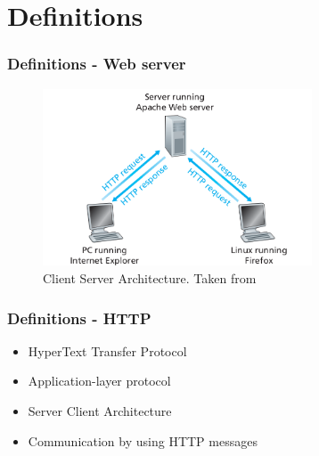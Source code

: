 \documentclass[9pt]{beamer}
\begin{document}
\section{Definitions}
\begin{frame}
  \frametitle<presentation>{Definitions - Web server}

  \begin{figure}[h]
    \centerline{\includegraphics[width=8cm]{pics/client_server.png}}
    \caption{Client Server Architecture. Taken from \cite{kurose}}
  \end{figure}
  
\end{frame}

\begin{frame}
 \frametitle<presentation>{Definitions - HTTP}
    \begin{itemize}
    \item HyperText Transfer Protocol
    \item Application-layer protocol
    \item Server Client Architecture
    \item Communication by using HTTP messages
  \end{itemize}
\end{frame}
\end{document}
